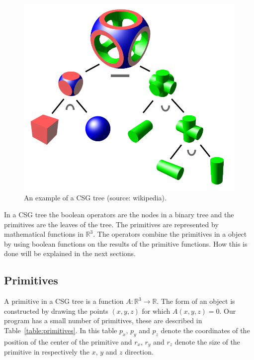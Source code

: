 \documentclass[a4paper,10pt,twoside]{report}
\begin{document}
    \begin{figure}[h]
        \begin{center}
            \includegraphics[scale=.2]{./images/csgtree.png}
        \end{center}
        \caption{An example of a CSG tree (source: wikipedia\cite{img:wiki_csg_tree}).}
        \label{figure:csg_tree}
    \end{figure}
    
    In a CSG tree the boolean operators are the nodes in a binary tree and the primitives are the leaves of the tree. The primitives are represented by mathematical functions in $\mathbb{R}^3$. The operators combine the primitives in a object by using boolean functions on the results of the primitive functions. How this is done will be explained in the next sections.\\

\subsection{Primitives}
    A primitive in a CSG tree is a function $A:\mathbb{R}^3 \rightarrow \mathbb{R}$. The form of an object is constructed by drawing the points $(x,y,z)$ for which $A(x,y,z)=0$. Our program has a small number of primitives, these are described in Table~\ref{table:primitives}. In this table $p_x$, $p_y$ and $p_z$ denote the coordinates of the position of the center of the primitive and $r_x$, $r_y$ and $r_z$ denote the size of the primitive in respectively the $x$, $y$ and $z$ direction.\\
    
\end{document}
